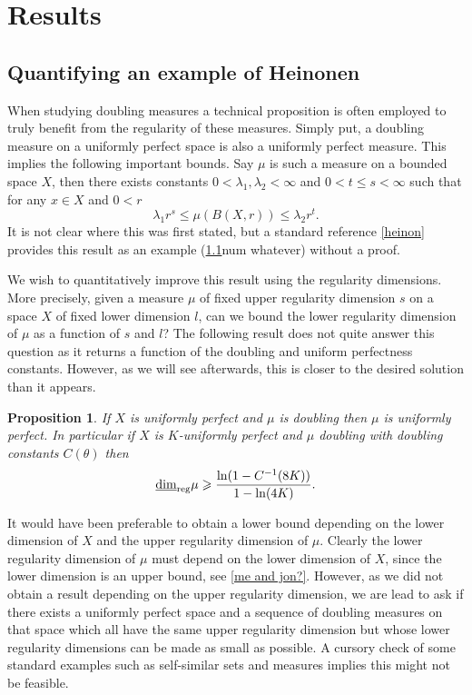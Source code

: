 \documentclass[12pt]{amsart}
\numberwithin{equation}{section}
\newtheorem{prop}[thm]{Proposition}
\renewcommand{\ge}{\geqslant}
\renewcommand{\le}{\leqslant}
\newcommand{\lrdim}{\underline{\dim}_{\textup{reg}}}
\begin{document}
\section{Results}

\subsection{Quantifying an example of Heinonen}


When studying doubling measures a technical proposition is often employed to truly benefit from the regularity of these measures. Simply put, a doubling measure on a uniformly perfect space is also a uniformly perfect measure. This implies the following important bounds. Say $\mu$ is such a measure on a bounded space $X$, then there exists constants $0< \lambda_1, \lambda_2 < \infty$ and $0 < t \le s < \infty$ such that for any $x \in X$ and $0 < r$
\[
\lambda_1 r^s \le \mu(B(X,r)) \le \lambda_2 r^t.
\]
It is not clear where this was first stated, but a standard reference \ref{heinon} provides this result as an example (\ref{}num whatever) without a proof. 

We wish to quantitatively improve this result using the regularity dimensions. More precisely, given a measure $\mu$ of fixed upper regularity dimension $s$ on a space $X$ of fixed lower dimension $l$, can we bound the lower regularity dimension of $\mu$ as a function of $s$ and $l$? The following result does not quite answer this question as it returns a function of the doubling and uniform perfectness constants. However, as we will see afterwards, this is closer to the desired solution than it appears.

\begin{prop}
If $X$ is uniformly perfect and $\mu$ is doubling then $\mu$ is uniformly perfect. In particular if $X$ is $K$-uniformly perfect and $\mu$ doubling with doubling constants $C(\theta)$ then  
$$\lrdim \mu \ge \frac{\ln(1-C^{-1}(8K))}{1-\ln(4K)} .$$  
\end{prop}



It would have been preferable to obtain a lower bound depending on the lower dimension of $X$ and the upper regularity dimension of $\mu$. Clearly the lower regularity dimension of $\mu$ must depend on the lower dimension of $X$, since the lower dimension is an upper bound, see \ref{me and jon?}. However, as we did not obtain a result depending on the upper regularity dimension, we are lead to ask if there exists a uniformly perfect space and a sequence of doubling measures on that space which all have the same upper regularity dimension but whose lower regularity dimensions can be made as small as possible. A cursory check of some standard examples such as self-similar sets and measures implies this might not be feasible. 
\end{document}
